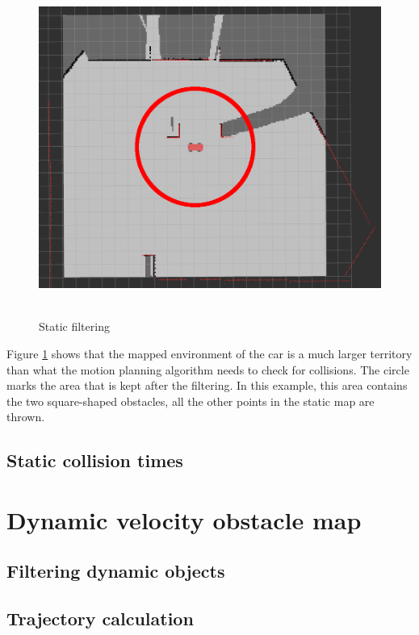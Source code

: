 \begin{figure}[!ht]
    \centering
    \includegraphics[height=110mm]{figures/raw/rviz_2_near_static_objects_filter.png}
    \caption{Static filtering}
    \label{rviz_2_near_static_objects_filter}
\end{figure}

Figure \ref{rviz_2_near_static_objects_filter} shows that the mapped environment of the car is a much larger territory than what the motion planning algorithm needs to check for collisions. The circle marks the area that is kept after the filtering. In this example, this area contains the two square-shaped obstacles, all the other points in the static map are thrown.

\subsection{Static collision times}

\section{Dynamic velocity obstacle map}
\label{chap:dynamic_velocity_obstacle_map}

\subsection{Filtering dynamic objects}

\subsection{Trajectory calculation}


